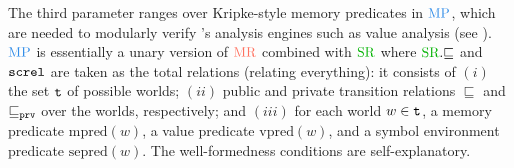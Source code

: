 




The third parameter ranges over Kripke-style memory predicates in $\MPRED$,
which are needed to modularly verify \cc{}'s analysis engines such as value analysis (see ).
$\MPRED$ is essentially a unary version of $\MREL$ combined with $\SREL$
where $\SREL{}.{\sqsubseteq}$ and $\texttt{screl}$ are taken as the total relations (\ie relating everything):
it consists of
$(i)$ the set $\texttt{t}$ of possible worlds;
$(ii)$ public and private transition relations $\sqsubseteq$ and $\sqsubseteq_{\texttt{prv}}$ over the worlds, respectively; and
$(iii)$ for each world $w \in \texttt{t}$, a memory predicate $\textrm{mpred}(w)$,
a value predicate $\textrm{vpred}(w)$, and a symbol environment predicate $\textrm{sepred}(w)$.
The well-formedness conditions are self-explanatory.

